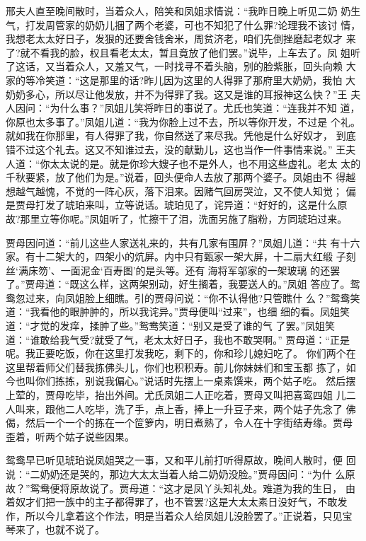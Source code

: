 邢夫人直至晚间散时，当着众人，陪笑和凤姐求情说：“我昨日晚上听见二奶
奶生气，打发周管家的奶奶儿捆了两个老婆，可也不知犯了什么罪?论理我不该讨
情，我想老太太好日子，发狠的还要舍钱舍米，周贫济老，咱们先倒挫磨起老奴才
来了?就不看我的脸，权且看老太太，暂且竟放了他们罢。”说毕，上车去了。凤
姐听了这话，又当着众人，又羞又气，一时找寻不着头脑，别的脸紫胀，回头向赖
大家的等冷笑道：“这是那里的话?昨儿因为这里的人得罪了那府里大奶奶，我怕
大奶奶多心，所以尽让他发放，并不为得罪了我。这又是谁的耳报神这么快？”王
夫人因问：“为什么事？”凤姐儿笑将昨日的事说了。尤氏也笑道：“连我并不知
道，你原也太多事了。”凤姐儿道：“我为你脸上过不去，所以等你开发，不过是
个礼。就如我在你那里，有人得罪了我，你自然送了来尽我。凭他是什么好奴才，
到底错不过这个礼去。这又不知谁过去，没的献勤儿，这也当作一件事情来说。”
王夫人道：“你太太说的是。就是你珍大嫂子也不是外人，也不用这些虚礼。老太
太的千秋要紧，放了他们为是。”说着，回头便命人去放了那两个婆子。凤姐由不
得越想越气越愧，不觉的一阵心灰，落下泪来。因赌气回房哭泣，又不使人知觉；
偏是贾母打发了琥珀来叫，立等说话。琥珀见了，诧异道：“好好的，这是什么原
故?那里立等你呢。”凤姐听了，忙擦干了泪，洗面另施了脂粉，方同琥珀过来。

贾母因问道：“前儿这些人家送礼来的，共有几家有围屏？”凤姐儿道：“共
有十六家。有十二架大的，四架小的炕屏。内中只有甄家一架大屏，十二扇大红缎
子刻丝‘满床笏’、一面泥金‘百寿图’的是头等。还有海将军邬家的一架玻璃
的还罢了。”贾母道：“既这么样，这两架别动，好生搁着，我要送人的。”凤姐
答应了。鸳鸯忽过来，向凤姐脸上细瞧。引的贾母问说：“你不认得他?只管瞧什
么？”鸳鸯笑道：“我看他的眼肿肿的，所以我诧异。”贾母便叫“过来”，也细
细的看。凤姐笑道：“才觉的发痒，揉肿了些。”鸳鸯笑道：“别又是受了谁的气
了罢。”凤姐笑道：“谁敢给我气受?就受了气，老太太好日子，我也不敢哭啊。”
贾母道：“正是呢。我正要吃饭，你在这里打发我吃，剩下的，你和珍儿媳妇吃了。
你们两个在这里帮着师父们替我拣佛头儿，你们也积积寿。前儿你妹妹们和宝玉都
拣了，如今也叫你们拣拣，别说我偏心。”说话时先摆上一桌素馔来，两个姑子吃。
然后摆上荤的，贾母吃毕，抬出外间。尤氏凤姐二人正吃着，贾母又叫把喜鸾四姐
儿二人叫来，跟他二人吃毕，洗了手，点上香，捧上一升豆子来，两个姑子先念了
佛偈，然后一个一个的拣在一个笸箩内，明日煮熟了，令人在十字街结寿缘。贾母
歪着，听两个姑子说些因果。

鸳鸯早已听见琥珀说凤姐哭之一事，又和平儿前打听得原故，晚间人散时，便
回说：“二奶奶还是哭的，那边大太太当着人给二奶奶没脸。”贾母因问：“为什
么原故？”鸳鸯便将原故说了。贾母道：“这才是凤丫头知礼处。难道为我的生日，
由着奴才们把一族中的主子都得罪了，也不管罢?这是大太太素日没好气，不敢发
作，所以今儿拿着这个作法，明是当着众人给凤姐儿没脸罢了。”正说着，只见宝
琴来了，也就不说了。

